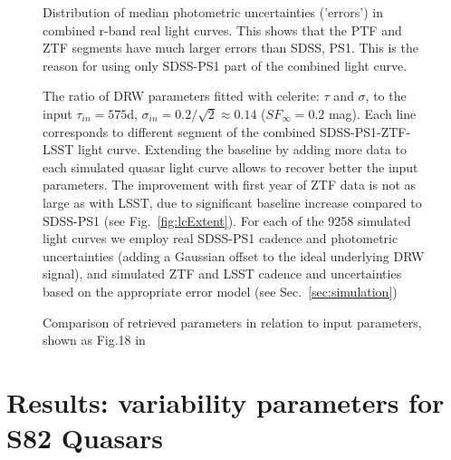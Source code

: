 \documentclass[twocolumn]{aastex62}
\newcommand{\project}[1]{\textsf{#1}}
\begin{document}
\begin{figure}%
\caption{Distribution of median photometric uncertainties ('errors') in combined r-band real light curves. This shows that the PTF and ZTF segments have much larger errors than SDSS, PS1. This is the reason for using only SDSS-PS1 part of the combined light curve.}
\label{fig:combinedLCerrors}
\end{figure} 


\begin{figure*}  %
\caption{The ratio of DRW parameters fitted with \project{celerite}: $\tau$ and $\sigma$, to the input $\tau_{in} = 575 $d, $\sigma_{in} = 0.2 / \sqrt{2} \approx 0.14$  ($SF_{\infty}=0.2$ mag).  Each line corresponds to different segment of the combined SDSS-PS1-ZTF-LSST light curve. Extending the baseline by adding more data to each simulated quasar light curve allows to recover better the input parameters. The improvement with first year of ZTF data is not as large as with LSST, due to significant baseline increase compared to SDSS-PS1 (see Fig.~\ref{fig:lcExtent}). For each of the 9258 simulated light curves we employ real SDSS-PS1 cadence and photometric uncertainties (adding a Gaussian offset to the ideal underlying DRW signal), and simulated ZTF and LSST cadence and uncertainties based on the appropriate error model (see Sec.~\ref{sec:simulation})}
\label{fig:simLCresults1}
\end{figure*} 

\begin{figure*} %
\caption{Comparison of retrieved parameters in relation to input parameters, shown as Fig.18 in \citet{macleod2011} }
\label{fig:simLCresults2}
\end{figure*} 


%
%
%
%
%
%
%
%

\section{Results: variability parameters for S82 Quasars}\label{sec:results}
\end{document}
